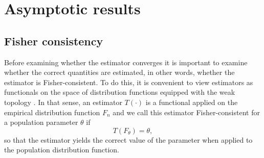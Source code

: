 \documentclass[11pt]{article}
\begin{document}
\section{Asymptotic results}

\subsection{Fisher consistency}

Before examining whether the estimator converges it is important to examine whether the correct quantities are estimated, in other words, whether the estimator is Fisher-consistent. To do this, it is convenient to view estimators as functionals on the space of distribution functions equipped with the weak topology \citep{huber2009robust}. In that sense, an estimator $T(\cdot)$ is a functional applied on the empirical distribution function $F_n$ and we call this estimator Fisher-consistent for a population parameter $\theta$ if
\begin{equation}
T(F_\theta) = \theta,
\end{equation}
so that the estimator yields the correct value of the parameter when applied to the population distribution function.
\end{document}
